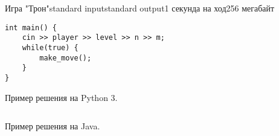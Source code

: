 \begin{problem}{Игра "Трон"}{standard input}{standard output}{1 секунда на ход}{256 мегабайт}
\begin{verbatim}
int main() {
    cin >> player >> level >> n >> m;
    while(true) {
        make_move();
    }
}
\end{verbatim}

\end{problem}

\newpage
Пример решения на Python 3.
\begin{verbatim}

\end{verbatim}
\newpage
Пример решения на Java.
\begin{verbatim}

\end{verbatim}